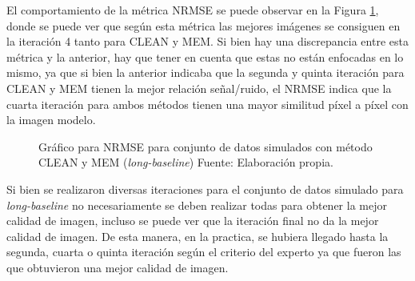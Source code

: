 El comportamiento de la métrica NRMSE se puede observar en la Figura \ref{fig:NRMSE_long_sim}, donde se puede ver que según esta métrica las mejores imágenes se consiguen en la iteración 4 tanto para CLEAN y MEM. Si bien hay una discrepancia entre esta métrica y la anterior, hay que tener en cuenta que estas no están enfocadas en lo mismo, ya que si bien la anterior indicaba que la segunda y quinta iteración para CLEAN y MEM tienen la mejor relación señal/ruido, el NRMSE indica que la cuarta iteración para ambos métodos tienen una mayor similitud píxel a píxel con la imagen modelo.

\begin{figure}[!ht]
 \centering
 \caption[Gráfico para NRMSE para conjunto de datos simulados con método CLEAN y MEM (\textit{long-baseline})]{Gráfico para NRMSE para conjunto de datos simulados con método CLEAN y MEM (\textit{long-baseline}) Fuente: Elaboración propia.}
 \label{fig:NRMSE_long_sim}
\end{figure}

Si bien se realizaron diversas iteraciones para el conjunto de datos simulado para \textit{long-baseline} no necesariamente se deben realizar todas para obtener la mejor calidad de imagen, incluso se puede ver que la iteración final no da la mejor calidad de imagen. De esta manera, en la practica, se hubiera llegado hasta la segunda, cuarta o quinta iteración según el criterio del experto ya que fueron las que obtuvieron una mejor calidad de imagen. 


